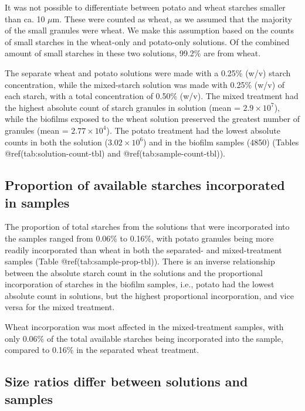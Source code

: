 \documentclass[
  letterpaper,
]{book}
\begin{document}
It was not possible to differentiate between potato and wheat starches
smaller than ca. 10 \(\mu\)m. These were counted as wheat, as we assumed
that the majority of the small granules were wheat. We make this
assumption based on the counts of small starches in the wheat-only and
potato-only solutions. Of the combined amount of small starches in these
two solutions, 99.2\% are from wheat.

The separate wheat and potato solutions were made with a 0.25\% (w/v)
starch concentration, while the mixed-starch solution was made with
0.25\% (w/v) of each starch, with a total concentration of 0.50\% (w/v).
The mixed treatment had the highest absolute count of starch granules in
solution (mean = \ensuremath{2.9\times 10^{7}}), while the biofilms
exposed to the wheat solution preserved the greatest number of granules
(mean = \ensuremath{2.77\times 10^{4}}). The potato treatment had the
lowest absolute counts in both the solution
(\ensuremath{3.02\times 10^{6}}) and in the biofilm samples (4850)
(Tables @ref(tab:solution-count-tbl) and @ref(tab:sample-count-tbl)).

\hypertarget{proportion-of-available-starches-incorporated-in-samples}{%
\subsection{Proportion of available starches incorporated in
samples}\label{proportion-of-available-starches-incorporated-in-samples}}

The proportion of total starches from the solutions that were
incorporated into the samples ranged from 0.06\% to 0.16\%, with potato
granules being more readily incorporated than wheat in both the
separated- and mixed-treatment samples (Table
@ref(tab:sample-prop-tbl)). There is an inverse relationship between the
absolute starch count in the solutions and the proportional
incorporation of starches in the biofilm samples, i.e., potato had the
lowest absolute count in solutions, but the highest proportional
incorporation, and vice versa for the mixed treatment.

Wheat incorporation was most affected in the mixed-treatment samples,
with only 0.06\% of the total available starches being incorporated into
the sample, compared to 0.16\% in the separated wheat treatment.

\hypertarget{size-ratios-differ-between-solutions-and-samples}{%
\subsection{Size ratios differ between solutions and
samples}\label{size-ratios-differ-between-solutions-and-samples}}
\end{document}
